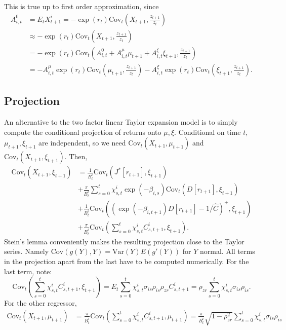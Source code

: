 This is true up to first order approximation, since 
\begin{align*}
A_{i, t}^0 &= E_t X_{t+1}^i = - \exp(r_t) \text{Cov}_t(X_{t+1}, \frac{z_{t+1}}{z_t})\\
&\approx  - \exp(r_t) \text{Cov}_t(X_{t+1}, \frac{z_{t+1}}{z_t}) \\
&=- \exp(r_t) \text{Cov}_t( A_{i,t}^0 + A_{i,t}^\mu \mu_{t+1} + A_{i,t}^\xi \xi_{t+1}, \frac{z_{t+1}}{z_t}) \\
&= - A_{i,t}^\mu \exp(r_t) \text{Cov}_t(\mu_{t+1} , \frac{z_{t+1}}{z_t}) - A_{i,t}^\xi 
\exp(r_t) \text{Cov}_t( \xi_{t+1}, \frac{z_{t+1}}{z_t}).
\end{align*}

\subsection{Projection} 

An alternative to the two factor linear Taylor expansion model is to simply compute the conditional projection of returns onto $\mu, \xi.$ Conditional on time $t$, $\mu_{t+1}, \xi_{t+1}$ are independent, so we need $\text{Cov}_t(X_{t+1}, \mu_{t+1})$ and $\text{Cov}_t(X_{t+1}, \xi_{t+1}).$ Then, 
\begin{align*}
    \text{Cov}_t(X_{t+1}, \xi_{t+1}) &= \frac{1}{B_t^i} \text{Cov}_t(J^*[r_{t+1}],  \xi_{t+1}) \\
    &+ \frac{\pi}{B_t^i}\sum_{s = 0}^t \chi_{s, t}^i \exp(- \beta_{i, s}) \text{Cov}_t(D[r_{t+1}] ,  \xi_{t+1}) \\
    &+ \frac{1}{B_t^i} \text{Cov}_t((\exp(- \beta_{i, t+1} )D[r_{t+1}] - 1/\hat C)^+,  \xi_{t+1}) \\
    &+ \frac{\pi}{B_t^i} \text{Cov}_t(\sum_{s=0}^t \chi_{s, t}^i C_{s, t+1}^i,  \xi_{t+1}).
\end{align*}
Stein's lemma conveniently makes the resulting projection close to the Taylor series. Namely $\text{Cov} (g(Y), Y) = \text{Var}(Y) E(g'(Y))$ for $Y$ normal. All terms in the projection apart from the last have to be computed numerically. For the last term, note:
\[
\text{Cov}_t(\sum_{s=0}^t \chi_{s, t}^i C_{s, t+1}^i,  \xi_{t+1}) = E_t \sum_{s=0}^t \chi_{s, t}^i \sigma_{is} \rho_{is} \rho_{zr} C_{s, t+1}^i = \rho_{zr} \sum_{s=0}^t \chi_{s, t}^i \sigma_{is} \rho_{is}.
\]
For the other regressor, 
\begin{align*}
    \text{Cov}_t(X_{t+1}, \mu_{t+1}) &=\frac{\pi}{B_t^i} \text{Cov}_t(\sum_{s=0}^t \chi_{s, t}^i C_{s, t+1}^i, \mu_{t+1}) = \frac{\pi}{B_t^i }\sqrt{1-\rho_{zr}^2} \sum_{s=0}^t \chi_{s, t}^i \sigma_{is} \rho_{is} 
\end{align*}

